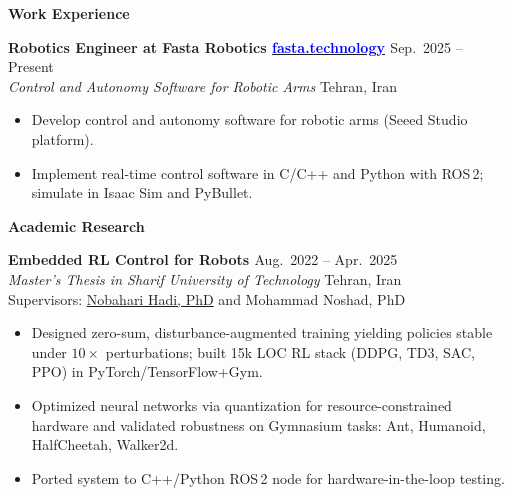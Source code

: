 \documentclass[12pt]{article}
\begin{document}
\noindent
{\large \bfseries Work Experience}
\vspace{4pt}

\noindent
{\bfseries Robotics Engineer at Fasta Robotics
\href{https://fasta.technology}{\textcolor{blue}{fasta.technology}}
\href{https://www.linkedin.com/company/fasta-robotics/}{\faLinkedin}
} \hfill Sep.\ 2025 -- Present \\[2pt]
\noindent \textit{Control and Autonomy Software for Robotic Arms} \hfill Tehran, Iran
\vspace{-5pt}
\begin{itemize}   \itemsep 0pt
	\item Develop control and autonomy software for robotic arms (Seeed Studio platform).
	\item Implement real-time control software in C/C++ and Python with ROS\,2; simulate in Isaac Sim and PyBullet.
\end{itemize}

\vspace{2pt}

\noindent
{\large \bfseries Academic Research}
\vspace{8pt}

\noindent
{\bfseries  Embedded RL Control for Robots
\href{https://github.com/alibaniasad1999/master-thesis}{\faGithub}
} \hfill Aug.\ 2022 -- Apr.\ 2025 \\[2pt]
\noindent \textit{Master's Thesis in Sharif University of Technology} \hfill Tehran, Iran \\[2pt]
\noindent Supervisors:
\href{https://ae.sharif.edu/~portal/faculty/1091235256}{Nobahari Hadi, PhD} 
{
	and
Mohammad Noshad, PhD
 }{}
\vspace{-5pt}
\begin{itemize}   \itemsep 0pt
	\item Designed zero-sum, disturbance-augmented training yielding policies stable under $10\times$ perturbations; built 15k LOC RL stack (DDPG, TD3, SAC, PPO) in PyTorch/TensorFlow+Gym.
	\item Optimized neural networks via quantization for resource-constrained hardware and validated robustness on Gymnasium tasks: Ant, Humanoid, HalfCheetah, Walker2d.
	\item Ported system to C++/Python ROS\,2 node for hardware-in-the-loop testing.
\end{itemize}
\vspace{-2pt}
\end{document}
